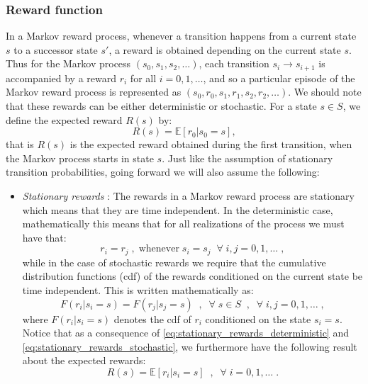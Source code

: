 \documentclass{article}
\theoremstyle{definition}
\theoremstyle{remark}
\newcommand{\E}{\mathbb{E}}                                        %
\begin{document}
\subsubsection{Reward function}
In a Markov reward process, whenever a transition happens from a current state $s$ to a successor state $s'$, a reward is obtained depending on the current state $s$. Thus for the Markov process $(s_0, s_1, s_2, \dots)$, each transition $s_i \rightarrow s_{i+1}$ is accompanied by a reward $r_i$ for all $i = 0,1,\dots$, and so a particular episode of the Markov reward process is represented as $(s_0, r_0, s_1, r_1, s_2, r_2, \dots)$. We should note that these rewards can be either deterministic or stochastic. For a state $s \in S$, we define the expected reward $R(s)$ by:
\begin{equation}
R(s) = \E[r_0|s_0 = s],
\label{eq:expexted_reward_func}
\end{equation}
that is $R(s)$ is the expected reward obtained during the first transition, when the Markov process starts in state $s$. Just like the assumption of stationary transition probabilities, going forward we will also assume the following:
\begin{itemize}
\item \textit{Stationary rewards} : The rewards in a Markov reward process are stationary which means that they are time independent. In the deterministic case, mathematically this means that for all realizations of the process we must have that:
\begin{equation}
r_i = r_j \; , \; \text{whenever} \; s_i = s_j \;\; \forall \; i,j = 0,1,\dots \;,
\label{eq:stationary_rewards_deterministic}
\end{equation}
while in the case of stochastic rewards we require that the cumulative distribution functions (cdf) of the rewards conditioned on the current state be time independent. This is written mathematically as:
\begin{equation}
F(r_i | s_i = s) = F(r_j | s_j = s) \;\;,\;\; \forall \; s \in S \;\;,\;\; \forall \; i,j = 0,1,\dots \;,
\label{eq:stationary_rewards_stochastic}
\end{equation}
where $F(r_i | s_i = s)$ denotes the cdf of $r_i$ conditioned on the state $s_i = s$. Notice that as a consequence of \eqref{eq:stationary_rewards_deterministic} and \eqref{eq:stationary_rewards_stochastic}, we furthermore have the following result about the expected rewards:
\begin{equation}
R(s) = \E[r_i|s_i = s] \;\;,\;\; \forall \; i = 0,1,\dots \;.
\label{eq:expected_reward_func1}
\end{equation}
\end{itemize}
\end{document}
